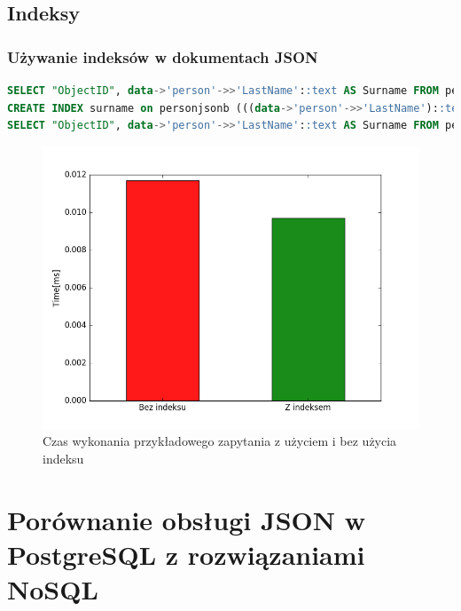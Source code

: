 \documentclass{beamer}
\begin{document}
\subsection{Indeksy}
\begin{frame}[fragile]
\frametitle{Używanie indeksów w dokumentach JSON}
\begin{lstlisting}[language=SQL,basicstyle=\tiny]
SELECT "ObjectID", data->'person'->>'LastName'::text AS Surname FROM personjsonb WHERE data->'person'->>'LastName'::text LIKE 'T%';
CREATE INDEX surname on personjsonb (((data->'person'->>'LastName')::text));
SELECT "ObjectID", data->'person'->>'LastName'::text AS Surname FROM personjsonb WHERE data->'person'->>'LastName'::text LIKE 'T%';
\end{lstlisting}
\begin{figure}[h]
\begin{center}
\includegraphics[scale=0.36]{ax/figindex}
\end{center}
\caption{Czas wykonania przykładowego zapytania z użyciem i bez użycia indeksu}
\end{figure}
\end{frame}
\section{Porównanie obsługi JSON w PostgreSQL z rozwiązaniami NoSQL}
\end{document}
